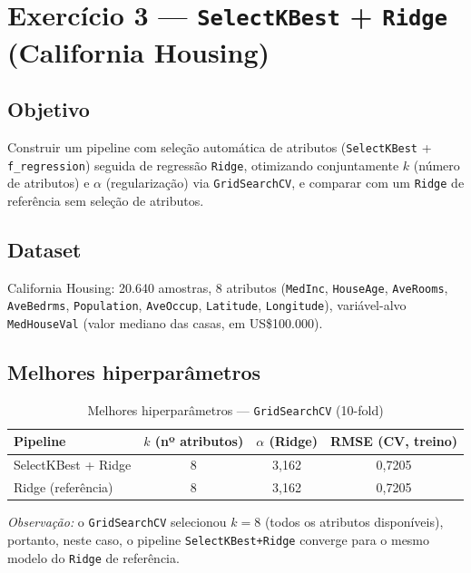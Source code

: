 \documentclass[12pt,a4paper]{article}
\begin{document}
\newpage
\section{Exercício 3 --- \texttt{SelectKBest} + \texttt{Ridge} (California Housing)}

\subsection{Objetivo}
Construir um pipeline com seleção automática de atributos (\texttt{SelectKBest} + \texttt{f\_regression}) seguida de regressão \texttt{Ridge}, otimizando conjuntamente $k$ (número de atributos) e $\alpha$ (regularização) via \texttt{GridSearchCV}, e comparar com um \texttt{Ridge} de referência sem seleção de atributos.

\subsection{Dataset}
California Housing: 20.640 amostras, 8 atributos (\texttt{MedInc}, \texttt{HouseAge}, \texttt{AveRooms}, \texttt{AveBedrms}, \texttt{Population}, \texttt{AveOccup}, \texttt{Latitude}, \texttt{Longitude}), variável-alvo \texttt{MedHouseVal} (valor mediano das casas, em US\$100.000).

\subsection{Melhores hiperparâmetros}

\begin{table}[H]
\centering
\caption{Melhores hiperparâmetros --- \texttt{GridSearchCV} (10-fold)}
\begin{tabular}{lccc}
\toprule
Pipeline & $k$ (nº atributos) & $\alpha$ (Ridge) & RMSE (CV, treino) \\
\midrule
SelectKBest + Ridge & 8 & 3{,}162 & 0{,}7205 \\
Ridge (referência)  & 8 & 3{,}162 & 0{,}7205 \\
\bottomrule
\end{tabular}
\end{table}

\noindent \textit{Observação:} o \texttt{GridSearchCV} selecionou $k=8$ (todos os atributos disponíveis), portanto, neste caso, o pipeline \texttt{SelectKBest+Ridge} converge para o mesmo modelo do \texttt{Ridge} de referência.
\end{document}

